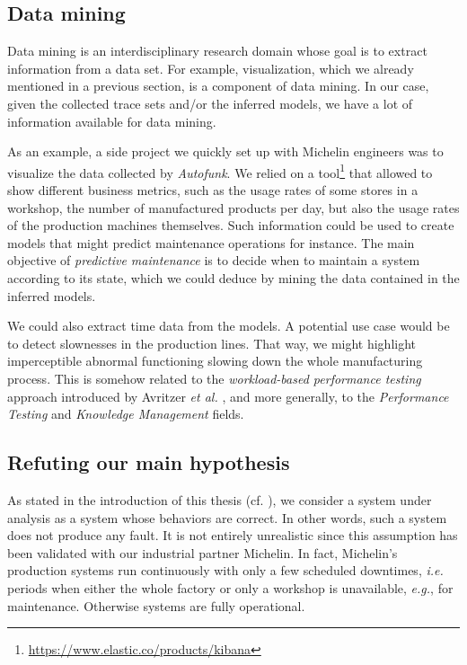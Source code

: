 \subsection{Data mining}
\label{sec:conclusion:testing:data}

Data mining \cite{chakrabarti2006data} is an interdisciplinary
research domain whose goal is to extract information from a data
set. For example, visualization, which we already mentioned in a
previous section, is a component of data mining. In our case,
given the collected trace sets and/or the inferred models, we
have a lot of information available for data mining.

As an example, a side project we quickly set up with Michelin
engineers was to visualize the data collected by
\textit{Autofunk}. We relied on a
tool\footnote{\url{https://www.elastic.co/products/kibana}} that
allowed to show different business metrics, such as the usage
rates of some stores in a workshop, the number of manufactured
products per day, but also the usage rates of the production
machines themselves. Such information could be used to create
models that might predict maintenance operations for instance.
The main objective of \emph{predictive maintenance}
\cite{mobley2002introduction} is to decide when to maintain a
system according to its state, which we could deduce by mining
the data contained in the inferred models.

We could also extract time data from the models. A potential use
case would be to detect slownesses in the production lines. That
way, we might highlight imperceptible abnormal functioning
slowing down the whole manufacturing process. This is somehow
related to the \emph{workload-based performance testing} approach
introduced by Avritzer \emph{et al.} \cite{avritzer2002software},
and more generally, to the \emph{Performance Testing}
\cite{vokolos1998performance} and \emph{Knowledge Management}
\cite{pachidi2015performance} fields.


\subsection{Refuting our main hypothesis}
\label{sec:conclusion:testing:valid}

As stated in the introduction of this thesis (cf.
), we consider a system
under analysis as a system whose behaviors are correct. In other
words, such a system does not produce any fault. It is not
entirely unrealistic since this assumption has been validated
with our industrial partner Michelin. In fact, Michelin's
production systems run continuously with only a few scheduled
downtimes, \emph{i.e.} periods when either the whole factory or only a
workshop is unavailable, \emph{e.g.}, for maintenance. Otherwise systems
are fully operational.

